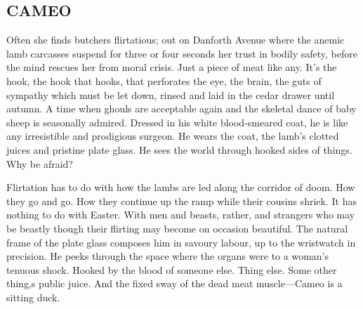 \documentclass[
]{memoir}
\begin{document}
\hypertarget{cameo}{%
\subsection*{CAMEO}\label{cameo}}

Often she finds butchers flirtatious; out on Danforth Avenue where the
anemic lamb carcasses suspend for three or four seconds her trust in
bodily safety, before the mind rescues her from moral crisis. Just a
piece of meat like any. It's the hook, the hook that hooks, that
perforates the eye, the brain, the guts of sympathy which must be let
down, rinsed and laid in the cedar drawer until autumn. A time when
ghouls are acceptable again and the skeletal dance of baby sheep is
seasonally admired. Dressed in his white blood-smeared coat, he is like
any irresistible and prodigious surgeon. He wears the coat, the lamb's
clotted juices and pristine plate glass. He sees the world through
hooked sides of things. Why be afraid?

Flirtation has to do with how the lambs are led along the corridor of
doom. How they go and go. How they continue up the ramp while their
cousins shriek. It has nothing to do with Easter. With men and beasts,
rather, and strangers who may be beastly though their flirting may
become on occasion beautiful. The natural frame of the plate glass
composes him in savoury labour, up to the wristwatch in precision. He
peeks through the space where the organs were to a woman's tenuous
shock. Hooked by the blood of someone else. Thing else. Some other
thing‚s public juice. And the fixed sway of the dead meat muscle---Cameo
is a sitting duck.
\end{document}
